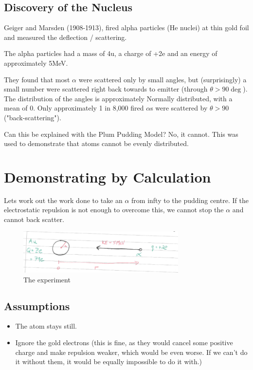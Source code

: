 \subsection*{Discovery of the Nucleus}
Geiger and Marsden (1908-1913), fired alpha particles (He nuclei) at thin gold foil and measured the deflection / scattering.

The alpha particles had a mass of 4u, a charge of +2e and an energy of approximately 5MeV.

They found that most $\alpha$ were scattered only by small angles, but (surprisingly) a small number were scattered right back towards to emitter (through $\theta > 90\deg$). The distribution of the angles is approximately Normally distributed, with a mean of 0. Only approximately 1 in 8,000 fired $\alpha$s were scattered by $\theta>90$ ("back-scattering").

Can this be explained with the Plum Pudding Model? No, it cannot. This was used to demonstrate that atoms cannot be evenly distributed.

\section*{Demonstrating by Calculation}
Lets work out the work done to take an $\alpha$ from infty to the pudding centre. If the electrostatic repulsion is not enough to overcome this, we cannot stop the $\alpha$ and cannot back scatter.

\begin{figure}[H]
    \centering
    \includegraphics[width=0.75\textwidth]{figures/scattering.png}
     \caption{The experiment}
\end{figure}

\subsection*{Assumptions}
\begin{itemize}
    \item The atom stays still.
    \item Ignore the gold electrons (this is fine, as they would cancel some positive charge and make repulsion weaker, which would be even worse. If we can't do it without them, it would be equally impossible to do it with.)
\end{itemize}

